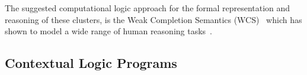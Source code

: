 \documentclass[12pt]{article}
\begin{document}
The suggested computational logic approach for the formal representation and reasoning of these clusters,
is the Weak Completion Semantics (WCS)~\cite{hk:2009a,hk:2009b}
which has shown to model a wide range of human reasoning tasks~\cite{btg:2015:h}. 

\subsection{Contextual Logic Programs} \label{sect:wcs}
\end{document}
